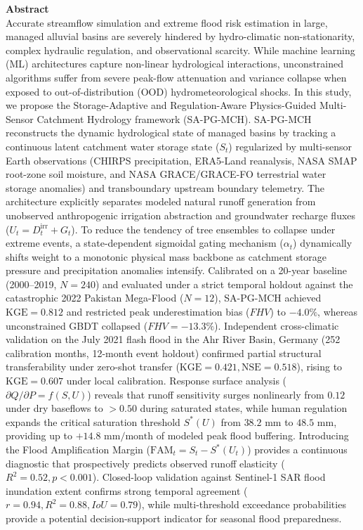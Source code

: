 \documentclass[11pt,a4paper,fleqn]{article}
\begin{document}
\begin{singlespace}
\noindent \textbf{Abstract}\\
Accurate streamflow simulation and extreme flood risk estimation in large, managed alluvial basins are severely hindered by hydro-climatic non-stationarity, complex hydraulic regulation, and observational scarcity. While machine learning (ML) architectures capture non-linear hydrological interactions, unconstrained algorithms suffer from severe peak-flow attenuation and variance collapse when exposed to out-of-distribution (OOD) hydrometeorological shocks. In this study, we propose the Storage-Adaptive and Regulation-Aware Physics-Guided Multi-Sensor Catchment Hydrology framework (SA-PG-MCH). SA-PG-MCH reconstructs the dynamic hydrological state of managed basins by tracking a continuous latent catchment water storage state ($S_t$) regularized by multi-sensor Earth observations (CHIRPS precipitation, ERA5-Land reanalysis, NASA SMAP root-zone soil moisture, and NASA GRACE/GRACE-FO terrestrial water storage anomalies) and transboundary upstream boundary telemetry. The architecture explicitly separates modeled natural runoff generation from unobserved anthropogenic irrigation abstraction and groundwater recharge fluxes ($U_t = D_t^{\text{irr}} + G_t$). To reduce the tendency of tree ensembles to collapse under extreme events, a state-dependent sigmoidal gating mechanism ($\alpha_t$) dynamically shifts weight to a monotonic physical mass backbone as catchment storage pressure and precipitation anomalies intensify. Calibrated on a 20-year baseline (2000--2019, $N=240$) and evaluated under a strict temporal holdout against the catastrophic 2022 Pakistan Mega-Flood ($N=12$), SA-PG-MCH achieved $\text{KGE} = 0.812$ and restricted peak underestimation bias ($FHV$) to $-4.0\%$, whereas unconstrained GBDT collapsed ($FHV = -13.3\%$). Independent cross-climatic validation on the July 2021 flash flood in the Ahr River Basin, Germany (252 calibration months, 12-month event holdout) confirmed partial structural transferability under zero-shot transfer ($\text{KGE} = 0.421, \text{NSE} = 0.518$), rising to $\text{KGE} = 0.607$ under local calibration. Response surface analysis ($\partial Q / \partial P = f(S, U)$) reveals that runoff sensitivity surges nonlinearly from $0.12$ under dry baseflows to $>0.50$ during saturated states, while human regulation expands the critical saturation threshold $S^*(U)$ from $38.2\text{ mm}$ to $48.5\text{ mm}$, providing up to $+14.8\text{ mm/month}$ of modeled peak flood buffering. Introducing the Flood Amplification Margin ($\text{FAM}_t = S_t - S^*(U_t)$) provides a continuous diagnostic that prospectively predicts observed runoff elasticity ($R^2 = 0.52, p < 0.001$). Closed-loop validation against Sentinel-1 SAR flood inundation extent confirms strong temporal agreement ($r = 0.94, R^2 = 0.88, IoU = 0.79$), while multi-threshold exceedance probabilities provide a potential decision-support indicator for seasonal flood preparedness.\\[1.2em]


\end{singlespace}
\end{document}
